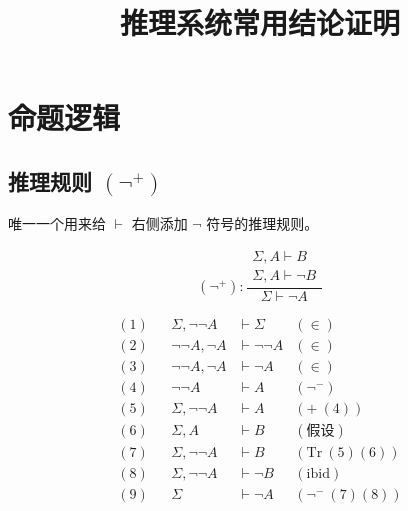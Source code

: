 \documentclass[UTF8]{ctexart}
\date{}
\title{\vspace{-4em} 推理系统常用结论证明 \vspace{-2em} }
\begin{document}
    \maketitle

    \setlength{\abovedisplayskip}{0pt}
    \setlength{\belowdisplayskip}{0pt}
    
    \section{命题逻辑 \vspace{-3pt}}

    \subsection*{推理规则 $(\lnot^{+})$ \vspace{-3pt}}
    唯一一个用来给 $\vdash$ 右侧添加 $\lnot$ 符号的推理规则。

    \begin{equation*}
        (\lnot^{+}): \dfrac{\begin{matrix}\Sigma, A \vdash B \\ \Sigma, A \vdash \lnot B \end{matrix}}{\Sigma \vdash \lnot A}
    \end{equation*}

    \begin{align*}
        (1) && \Sigma, \lnot \lnot A & \vdash \Sigma & (\in) \\
        (2) && \lnot \lnot A, \lnot A & \vdash \lnot \lnot A & (\in) \\
        (3) && \lnot \lnot A, \lnot A & \vdash \lnot A & (\in) \\
        (4) && \lnot \lnot A & \vdash A & (\lnot^{-}) \\
        (5) && \Sigma, \lnot \lnot A & \vdash A & (+\ (4)) \\
        (6) && \Sigma, A & \vdash B & (\text{假设}) \\
        (7) && \Sigma, \lnot \lnot A & \vdash B & (\mathrm{Tr}\ (5)(6)) \\
        (8) && \Sigma, \lnot \lnot A & \vdash \lnot B & (\mathrm{ibid}) \\
        (9) && \Sigma & \vdash \lnot A & (\lnot^{-}\ (7)(8))
    \end{align*}

\end{document}
